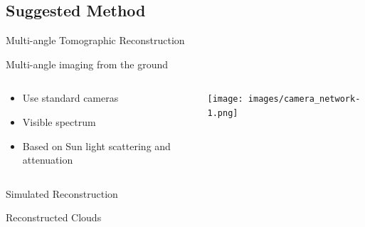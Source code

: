 \documentclass[compress,red,12pt]{beamer}
\begin{document}
\subsection{Suggested Method}

\begin{frame}{Multi-angle Tomographic Reconstruction}
  \begin{center}
    {
      \centerline{\def\svgwidth{\linewidth}\small{}}
    }
    {
      \centerline{\def\svgwidth{\linewidth}\small{}}
    }
  \end{center}
\end{frame}


\begin{frame}{Multi-angle imaging from the ground}
  \begin{columns}[T]
    \begin{column}{.5\textwidth}
      \begin{itemize}
      \item Use standard cameras
      \item Visible spectrum
      \item Based on Sun light scattering and attenuation
      \end{itemize}
    \end{column}
    \begin{column}{.5\textwidth}
      \centering
      {\texttt{[image: images/camera\_network-1.png]}}
    \end{column}
  \end{columns}
\end{frame}


\begin{frame}[label=current]{Simulated Reconstruction}
  \begin{center}
  \end{center}
\end{frame}


\begin{frame}[label=current]{Reconstructed Clouds}
  \centerline{
  }
\end{frame}
\end{document}
